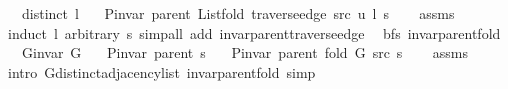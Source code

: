 \begin{isabellebody}
\ \ \ {\isachardoublequoteopen}distinct\ l{\isachardoublequoteclose}\isanewline
\ \ \ {\isachardoublequoteopen}P{\isacharunderscore}{\kern0pt}invar\ {\isacharparenleft}{\kern0pt}parent\ {\isacharparenleft}{\kern0pt}List{\isachardot}{\kern0pt}fold\ {\isacharparenleft}{\kern0pt}traverse{\isacharunderscore}{\kern0pt}edge\ src\ u{\isacharparenright}{\kern0pt}\ l\ s{\isacharparenright}{\kern0pt}{\isacharparenright}{\kern0pt}{\isachardoublequoteclose}%
\endisataginvisible
{\isafoldinvisible}%
%
\isadeliminvisible
\isanewline
%
\endisadeliminvisible
%
\isadelimproof
\ \ %
\endisadelimproof
%
\isatagproof
{}\isamarkupfalse%
\ assms\isanewline
\ \ \isamarkupfalse%
\ {\isacharparenleft}{\kern0pt}induct\ l\ arbitrary{\isacharcolon}{\kern0pt}\ s{\isacharparenright}{\kern0pt}\ {\isacharparenleft}{\kern0pt}simp{\isacharunderscore}{\kern0pt}all\ add{\isacharcolon}{\kern0pt}\ invar{\isacharunderscore}{\kern0pt}parent{\isacharunderscore}{\kern0pt}traverse{\isacharunderscore}{\kern0pt}edge{\isacharparenright}{\kern0pt}%
\endisatagproof
{\isafoldproof}%
%
\isadelimproof
\isanewline
%
\endisadelimproof
%
\isadeliminvisible
\isanewline
%
\endisadeliminvisible
%
\isataginvisible
{}\isamarkupfalse%
\ {\isacharparenleft}{\kern0pt}\ bfs{\isacharparenright}{\kern0pt}\ invar{\isacharunderscore}{\kern0pt}parent{\isacharunderscore}{\kern0pt}fold{\isacharunderscore}{\kern0pt}{}{\isacharcolon}{\kern0pt}\isanewline
\ \ \ {\isachardoublequoteopen}G{\isachardot}{\kern0pt}invar\ G{\isachardoublequoteclose}\isanewline
\ \ \ {\isachardoublequoteopen}P{\isacharunderscore}{\kern0pt}invar\ {\isacharparenleft}{\kern0pt}parent\ s{\isacharparenright}{\kern0pt}{\isachardoublequoteclose}\isanewline
\ \ \ {\isachardoublequoteopen}P{\isacharunderscore}{\kern0pt}invar\ {\isacharparenleft}{\kern0pt}parent\ {\isacharparenleft}{\kern0pt}fold\ G\ src\ s{\isacharparenright}{\kern0pt}{\isacharparenright}{\kern0pt}{\isachardoublequoteclose}%
\endisataginvisible
{\isafoldinvisible}%
%
\isadeliminvisible
\isanewline
%
\endisadeliminvisible
%
\isadelimproof
\ \ %
\endisadelimproof
%
\isatagproof
{}\isamarkupfalse%
\ assms\isanewline
\ \ \isamarkupfalse%
\ {\isacharparenleft}{\kern0pt}intro\ G{\isachardot}{\kern0pt}distinct{\isacharunderscore}{\kern0pt}adjacency{\isacharunderscore}{\kern0pt}list\ invar{\isacharunderscore}{\kern0pt}parent{\isacharunderscore}{\kern0pt}fold{\isacharparenright}{\kern0pt}\ simp{\isacharplus}{\kern0pt}%

\end{isabellebody}
